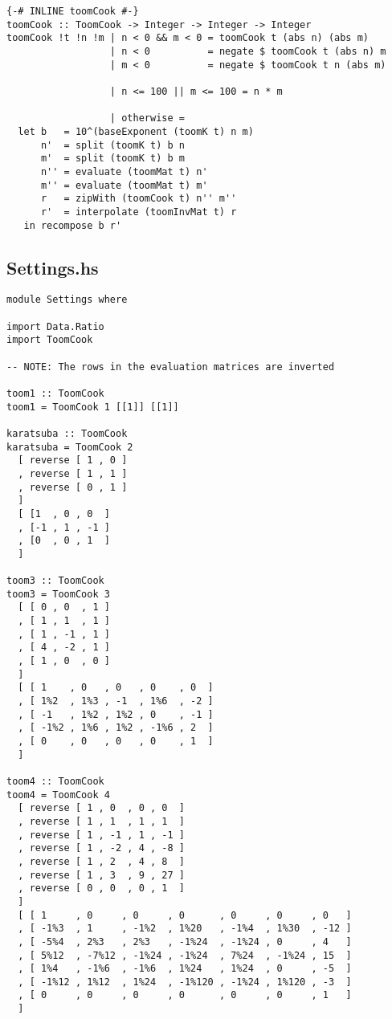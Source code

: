\begin{verbatim}
{-# INLINE toomCook #-}
toomCook :: ToomCook -> Integer -> Integer -> Integer
toomCook !t !n !m | n < 0 && m < 0 = toomCook t (abs n) (abs m)
                  | n < 0          = negate $ toomCook t (abs n) m
                  | m < 0          = negate $ toomCook t n (abs m)

                  | n <= 100 || m <= 100 = n * m

                  | otherwise =
  let b   = 10^(baseExponent (toomK t) n m)
      n'  = split (toomK t) b n
      m'  = split (toomK t) b m
      n'' = evaluate (toomMat t) n'
      m'' = evaluate (toomMat t) m'
      r   = zipWith (toomCook t) n'' m''
      r'  = interpolate (toomInvMat t) r
   in recompose b r'
\end{verbatim}

\subsection{Settings.hs}
\begin{verbatim}
module Settings where

import Data.Ratio
import ToomCook

-- NOTE: The rows in the evaluation matrices are inverted

toom1 :: ToomCook
toom1 = ToomCook 1 [[1]] [[1]]

karatsuba :: ToomCook
karatsuba = ToomCook 2
  [ reverse [ 1 , 0 ]
  , reverse [ 1 , 1 ]
  , reverse [ 0 , 1 ]
  ]
  [ [1  , 0 , 0  ]
  , [-1 , 1 , -1 ]
  , [0  , 0 , 1  ]
  ]

toom3 :: ToomCook
toom3 = ToomCook 3
  [ [ 0 , 0  , 1 ]
  , [ 1 , 1  , 1 ]
  , [ 1 , -1 , 1 ]
  , [ 4 , -2 , 1 ]
  , [ 1 , 0  , 0 ]
  ]
  [ [ 1    , 0   , 0   , 0    , 0  ]
  , [ 1%2  , 1%3 , -1  , 1%6  , -2 ]
  , [ -1   , 1%2 , 1%2 , 0    , -1 ]
  , [ -1%2 , 1%6 , 1%2 , -1%6 , 2  ]
  , [ 0    , 0   , 0   , 0    , 1  ]
  ]

toom4 :: ToomCook
toom4 = ToomCook 4
  [ reverse [ 1 , 0  , 0 , 0  ]
  , reverse [ 1 , 1  , 1 , 1  ]
  , reverse [ 1 , -1 , 1 , -1 ]
  , reverse [ 1 , -2 , 4 , -8 ]
  , reverse [ 1 , 2  , 4 , 8  ]
  , reverse [ 1 , 3  , 9 , 27 ]
  , reverse [ 0 , 0  , 0 , 1  ]
  ]
  [ [ 1     , 0     , 0     , 0      , 0     , 0     , 0   ]
  , [ -1%3  , 1     , -1%2  , 1%20   , -1%4  , 1%30  , -12 ]
  , [ -5%4  , 2%3   , 2%3   , -1%24  , -1%24 , 0     , 4   ]
  , [ 5%12  , -7%12 , -1%24 , -1%24  , 7%24  , -1%24 , 15  ]
  , [ 1%4   , -1%6  , -1%6  , 1%24   , 1%24  , 0     , -5  ]
  , [ -1%12 , 1%12  , 1%24  , -1%120 , -1%24 , 1%120 , -3  ]
  , [ 0     , 0     , 0     , 0      , 0     , 0     , 1   ]
  ]
\end{verbatim}

